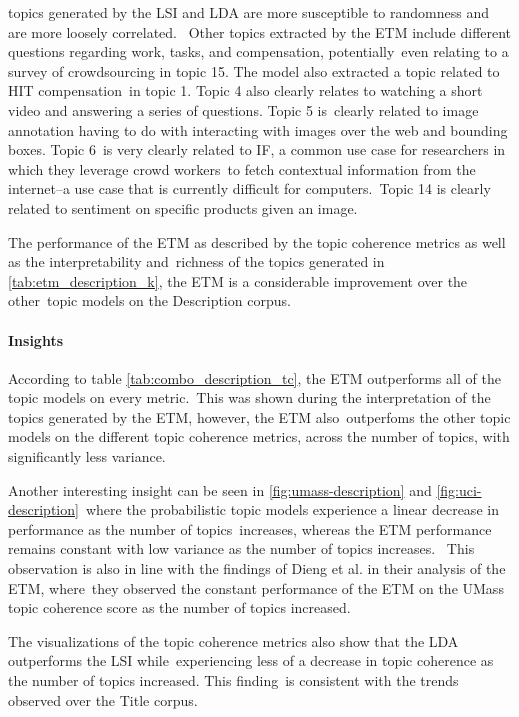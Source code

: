 \documentclass[letterpaper,12pt]{article}
\begin{document}
topics generated by the LSI and LDA are more susceptible to randomness and are more loosely correlated. \
Other topics extracted by the ETM include different questions regarding work, tasks, and compensation, potentially\
even relating to a survey of crowdsourcing in topic 15. The model also extracted a topic related to HIT compensation\
in topic 1. Topic 4 also clearly relates to watching a short video and answering a series of questions. Topic 5 is\
clearly related to image annotation having to do with interacting with images over the web and bounding boxes. Topic 6\
is very clearly related to IF, a common use case for researchers in which they leverage crowd workers\
to fetch contextual information from the internet--a use case that is currently difficult for computers.\
Topic 14 is clearly related to sentiment on specific products given an image.

The performance of the ETM as described by the topic coherence metrics as well as the interpretability and\
richness of the topics generated in \ref{tab:etm_description_k}, the ETM is a considerable improvement over the other\
topic models on the Description corpus.

\newpage

\paragraph{Insights}
According to table \ref{tab:combo_description_tc}, the ETM outperforms all of the topic models on every metric.\
This was shown during the interpretation of the topics generated by the ETM, however, the ETM also\
outperfoms the other topic models on the different topic coherence metrics, across the number of topics,
with significantly less variance.

Another interesting insight can be seen in \ref{fig:umass-description} and \ref{fig:uci-description}\
where the probabilistic topic models experience a linear decrease in performance as the number of topics\
increases, whereas the ETM performance remains constant with low variance as the number of topics increases. \
This observation is also in line with the findings of Dieng et al. in their analysis of the ETM, where\
they observed the constant performance of the ETM on the UMass topic coherence score as the number of topics increased.

The visualizations of the topic coherence metrics also show that the LDA outperforms the LSI while\
experiencing less of a decrease in topic coherence as the number of topics increased. This finding\
is consistent with the trends observed over the Title corpus.
\end{document}
